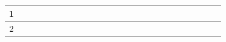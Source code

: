 \documentclass[
	12pt,				%
	openright,			%
	oneside,			%
	a4paper,			%
	brazil				%
	]{abntex2}
\begin{document}
\begin{table}[h]
\begin{tabular}{|c|cccccccccccc|cccccccccccc|}
		1                        & \multicolumn{1}{c|}{} & \multicolumn{1}{c|}{\cellcolor[HTML]{009901}} & \multicolumn{1}{c|}{\cellcolor[HTML]{009901}} & \multicolumn{1}{c|}{\cellcolor[HTML]{009901}} & \multicolumn{1}{c|}{\cellcolor[HTML]{009901}} & \multicolumn{1}{c|}{}                         & \multicolumn{1}{c|}{}                         & \multicolumn{1}{c|}{}                         & \multicolumn{1}{c|}{}                         & \multicolumn{1}{c|}{}                         & \multicolumn{1}{c|}{}                         &                          & \multicolumn{1}{c|}{}                         & \multicolumn{1}{c|}{}                         & \multicolumn{1}{c|}{}                         & \multicolumn{1}{c|}{}                         & \multicolumn{1}{c|}{}                         & \multicolumn{1}{c|}{}                         & \multicolumn{1}{c|}{}                         & \multicolumn{1}{c|}{}                         & \multicolumn{1}{c|}{}                         & \multicolumn{1}{c|}{}                         & \multicolumn{1}{c|}{}                         &  \\ \hline
		2                        & \multicolumn{1}{c|}{} & \multicolumn{1}{c|}{}                         & \multicolumn{1}{c|}{\cellcolor[HTML]{009901}} & \multicolumn{1}{c|}{\cellcolor[HTML]{009901}} & \multicolumn{1}{c|}{\cellcolor[HTML]{009901}} & \multicolumn{1}{c|}{\cellcolor[HTML]{009901}} & \multicolumn{1}{c|}{}                         & \multicolumn{1}{c|}{}                         & \multicolumn{1}{c|}{}                         & \multicolumn{1}{c|}{}                         & \multicolumn{1}{c|}{}                         &                          & \multicolumn{1}{c|}{}                         & \multicolumn{1}{c|}{}                         & \multicolumn{1}{c|}{}                         & \multicolumn{1}{c|}{}                         & \multicolumn{1}{c|}{}                         & \multicolumn{1}{c|}{}                         & \multicolumn{1}{c|}{}                         & \multicolumn{1}{c|}{}                         & \multicolumn{1}{c|}{}                         & \multicolumn{1}{c|}{}                         & \multicolumn{1}{c|}{}                         &  \\ \hline

\end{tabular}
\end{table}
\end{document}
